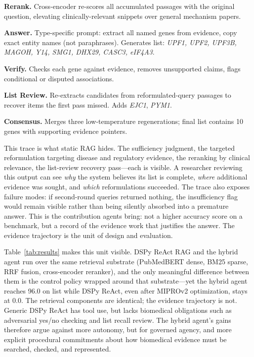 \documentclass[sigconf,anonymous,review]{acmart}
\begin{document}
\textbf{Rerank.} Cross-encoder re-scores all accumulated passages with the original question, elevating clinically-relevant snippets over general mechanism papers.

\textbf{Answer.} Type-specific prompt: extract all named genes from evidence, copy exact entity names (not paraphrases). Generates list: \textit{UPF1, UPF2, UPF3B, MAGOH, Y14, SMG1, DHX29, CASC3, eIF4A3}.

\textbf{Verify.} Checks each gene against evidence, removes unsupported claims, flags conditional or disputed associations.

\textbf{List Review.} Re-extracts candidates from reformulated-query passages to recover items the first pass missed. Adds \textit{EJC1}, \textit{PYM1}.

\textbf{Consensus.} Merges three low-temperature regenerations; final list contains 10 genes with supporting evidence pointers.

This trace is what static RAG hides. The sufficiency judgment, the targeted reformulation targeting disease and regulatory evidence, the reranking by clinical relevance, the list-review recovery pass---each is visible. A researcher reviewing this output can see \emph{why} the system believes its list is complete, \emph{where} additional evidence was sought, and \emph{which} reformulations succeeded. The trace also exposes failure modes: if second-round queries returned nothing, the insufficiency flag would remain visible rather than being silently absorbed into a premature answer. This is the contribution agents bring: not a higher accuracy score on a benchmark, but a record of the evidence work that justifies the answer. The evidence trajectory is the unit of design and evaluation.

Table~\ref{tab:results} makes this unit visible. DSPy ReAct RAG and the hybrid agent run over the same retrieval substrate (PubMedBERT dense, BM25 sparse, RRF fusion, cross-encoder reranker), and the only meaningful difference between them is the control policy wrapped around that substrate---yet the hybrid agent reaches 96.0 on list while DSPy ReAct, even after MIPROv2 optimization, stays at 0.0. The retrieval components are identical; the evidence trajectory is not. Generic DSPy ReAct has tool use, but lacks biomedical obligations such as adversarial yes/no checking and list recall review. The hybrid agent's gains therefore argue against more autonomy, but for governed agency, and more explicit procedural commitments about how biomedical evidence must be searched, checked, and represented.
\end{document}
